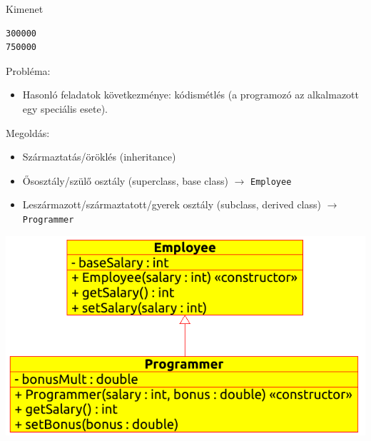 \begin{frame}[fragile]
    \begin{exampleblock}{}
        \footnotesize
        
    \end{exampleblock}
    \begin{block}{Kimenet}
        \footnotesize
        \vspace{-.3cm}
        \begin{verbatim}
300000
750000
        \end{verbatim}
        \vspace{-.6cm}
    \end{block}
\end{frame}

\begin{frame}
    Probléma:
    \begin{itemize}
        \item Hasonló feladatok következménye: kódismétlés (a programozó az alkalmazott egy speciális esete).
    \end{itemize}
    Megoldás:
    \begin{itemize}
        \item Származtatás/öröklés (inheritance)
        \item Ősosztály/szülő osztály (superclass, base class) $\to$ \texttt{Employee}
        \item Leszármazott/származtatott/gyerek osztály (subclass, derived class) $\to$ \texttt{Programmer}
    \end{itemize}
\end{frame}

\begin{frame}
    \begin{center}
        \includegraphics[scale=0.75]{inheritance02.eps}
      \end{center}
\end{frame}

